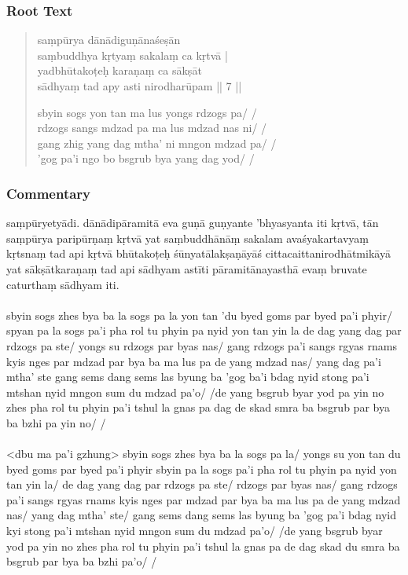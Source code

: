 \documentclass[12pt]{article}
\begin{document}
\subsubsection{Root Text}
\begin{quote}
	saṃpūrya dānādiguṇānaśeṣān \\
	saṃbuddhya kṛtyaṃ sakalaṃ ca kṛtvā |\\
	yadbhūtakoṭeḥ karaṇaṃ ca sākṣāt \\
	sādhyaṃ tad apy asti nirodharūpam || 7 ||

	sbyin sogs yon tan ma lus yongs rdzogs pa/ /\\
	rdzogs sangs mdzad pa ma lus mdzad nas ni/ /\\
	gang zhig yang dag mtha' ni mngon mdzad pa/ /\\
	'gog pa'i ngo bo bsgrub bya yang dag yod/ /
\end{quote}

\subsubsection{Commentary}
saṃpūryetyādi.
dānādipāramitā eva guṇā guṇyante 'bhyasyanta iti kṛtvā, tān saṃpūrya paripūrṇaṃ kṛtvā yat saṃbuddhānāṃ sakalam avaśyakartavyaṃ kṛtsnaṃ tad api kṛtvā bhūtakoṭeḥ śūnyatālakṣaṇāyāś cittacaitta\footnoteB{
	cittacaitta°] \EDD\ (\emd); cittacaitya° \MS
}nirodhātmikāyā yat sākṣātkaraṇaṃ tad api sādhyam astīti pāramitānayasthā evaṃ bruvate caturthaṃ sādhyam iti.\\

\textbf{\TVA}\\
sbyin sogs zhes bya ba la sogs pa la yon tan 'du byed goms par byed pa'i phyir/ spyan pa la sogs pa'i pha rol tu phyin pa nyid yon tan yin la de dag yang dag par rdzogs pa ste/ yongs su rdzogs par byas nas/ gang rdzogs pa'i sangs rgyas rnams kyis nges par mdzad par bya ba ma lus pa de yang mdzad nas/ yang dag pa'i mtha' ste gang sems dang sems las byung ba 'gog ba'i bdag nyid stong pa'i mtshan nyid mngon sum du mdzad pa'o/ /de yang bsgrub byar yod pa yin no zhes pha rol tu phyin pa'i tshul la gnas pa dag de skad smra ba bsgrub par bya ba bzhi pa yin no/ /\\

\textbf{\TVB}\\
<dbu ma pa'i gzhung> sbyin sogs zhes bya ba la sogs pa la/ yongs su yon tan du byed goms par byed pa'i phyir sbyin pa la sogs pa'i pha rol tu phyin pa nyid yon tan yin la/ de dag yang dag par rdzogs pa ste/ rdzogs par byas nas/ gang rdzogs pa'i sangs rgyas rnams kyis nges par mdzad par bya ba ma lus pa de yang mdzad nas/ yang dag mtha' ste/ gang sems dang sems las byung ba 'gog pa'i bdag nyid kyi stong pa'i mtshan nyid mngon sum du mdzad pa'o/ /de yang bsgrub byar yod pa yin no zhes pha rol tu phyin pa'i tshul la gnas pa de dag skad du smra ba bsgrub par bya ba bzhi pa'o/ /
\end{document}
